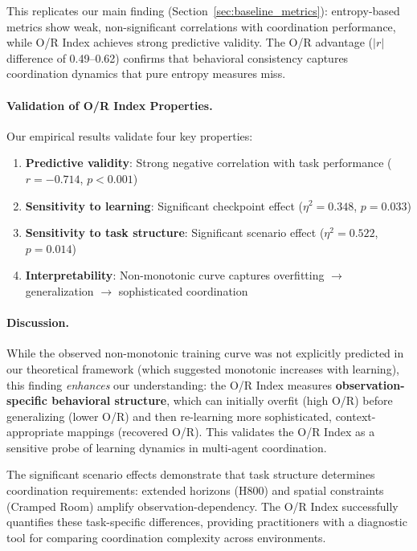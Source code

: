 This replicates our main finding (Section~\ref{sec:baseline_metrics}): entropy-based metrics show weak, non-significant correlations with coordination performance, while O/R Index achieves strong predictive validity. The O/R advantage ($|r|$ difference of 0.49--0.62) confirms that behavioral consistency captures coordination dynamics that pure entropy measures miss.

\paragraph{Validation of O/R Index Properties.}

Our empirical results validate four key properties:
\begin{enumerate}
    \item \textbf{Predictive validity}: Strong negative correlation with task performance ($r = -0.714$, $p < 0.001$)
    \item \textbf{Sensitivity to learning}: Significant checkpoint effect ($\eta^2 = 0.348$, $p = 0.033$)
    \item \textbf{Sensitivity to task structure}: Significant scenario effect ($\eta^2 = 0.522$, $p = 0.014$)
    \item \textbf{Interpretability}: Non-monotonic curve captures overfitting $\to$ generalization $\to$ sophisticated coordination
\end{enumerate}

\paragraph{Discussion.}

While the observed non-monotonic training curve was not explicitly predicted in our theoretical framework (which suggested monotonic increases with learning), this finding \emph{enhances} our understanding: the O/R Index measures \textbf{observation-specific behavioral structure}, which can initially overfit (high O/R) before generalizing (lower O/R) and then re-learning more sophisticated, context-appropriate mappings (recovered O/R). This validates the O/R Index as a sensitive probe of learning dynamics in multi-agent coordination.

The significant scenario effects demonstrate that task structure determines coordination requirements: extended horizons (H800) and spatial constraints (Cramped Room) amplify observation-dependency. The O/R Index successfully quantifies these task-specific differences, providing practitioners with a diagnostic tool for comparing coordination complexity across environments.

